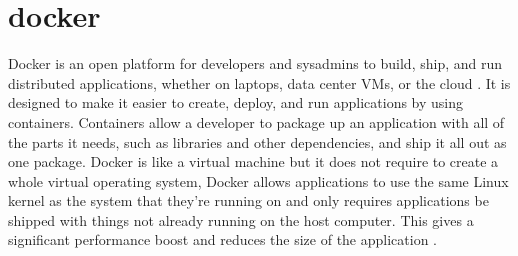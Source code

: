 \section{docker}
Docker is an open platform for developers and sysadmins to build, ship, and run distributed applications, whether on laptops, data center VMs, or the cloud \cite{docker}. It is designed to make it easier to create, deploy, and run applications by using containers. Containers allow a developer to package up an application with all of the parts it needs, such as libraries and other dependencies, and ship it all out as one package. Docker is like a virtual machine but it does not require to create a whole virtual operating system, Docker allows applications to use the same Linux kernel as the system that they're running on and only requires applications be shipped with things not already running on the host computer. This gives a significant performance boost and reduces the size of the application \cite{opensource}.

